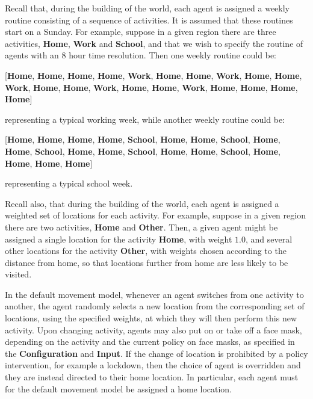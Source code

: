 \documentclass[10pt,letterpaper]{article}
\begin{document}
Recall that, during the building of the world, each agent is assigned a weekly routine consisting of a sequence of activities. It is assumed that these routines start on a Sunday. For example, suppose in a given region there are three activities, \textbf{Home}, \textbf{Work} and \textbf{School}, and that we wish to specify the routine of agents with an 8 hour time resolution. Then one weekly routine could be:
\begin{center}
[\textbf{Home}, \textbf{Home}, \textbf{Home}, \textbf{Home}, \textbf{Work}, \textbf{Home}, \textbf{Home}, \textbf{Work}, \textbf{Home}, \textbf{Home}, \textbf{Work}, \textbf{Home}, \textbf{Home}, \textbf{Work}, \textbf{Home}, \textbf{Home}, \textbf{Work}, \textbf{Home}, \textbf{Home}, \textbf{Home}, \textbf{Home}]
\end{center}
representing a typical working week, while another weekly routine could be:
\begin{center}
[\textbf{Home}, \textbf{Home}, \textbf{Home}, \textbf{Home}, \textbf{School}, \textbf{Home}, \textbf{Home}, \textbf{School}, \textbf{Home}, \textbf{Home}, \textbf{School}, \textbf{Home}, \textbf{Home}, \textbf{School}, \textbf{Home}, \textbf{Home}, \textbf{School}, \textbf{Home}, \textbf{Home}, \textbf{Home}, \textbf{Home}]
\end{center}
representing a typical school week.

Recall also, that during the building of the world, each agent is assigned a weighted set of locations for each activity. For example, suppose in a given region there are two activities, \textbf{Home} and \textbf{Other}. Then, a given agent might be assigned a single location for the activity \textbf{Home}, with weight $1.0$, and several other locations for the activity \textbf{Other}, with weights chosen according to the distance from home, so that locations further from home are less likely to be visited.

In the default movement model, whenever an agent switches from one activity to another, the agent randomly selects a new location from the corresponding set of locations, using the specified weights, at which they will then perform this new activity. Upon changing activity, agents may also put on or take off a face mask, depending on the activity and the current policy on face masks, as specified in the \textbf{Configuration} and \textbf{Input}. If the change of location is prohibited by a policy intervention, for example a lockdown, then the choice of agent is overridden and they are instead directed to their home location. In particular, each agent must for the default movement model be assigned a home location.
\end{document}
